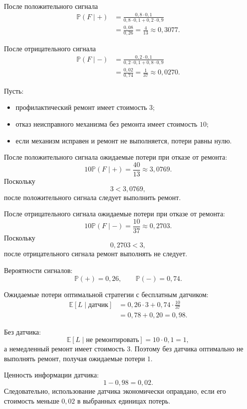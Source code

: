 \documentclass[12pt,a4paper]{article}
\theoremstyle{plain}
\theoremstyle{definition}
\theoremstyle{remark}
\newcommand{\Pp}{\mathbb{P}}
\newcommand{\Ee}{\mathbb{E}}
\begin{document}
После положительного сигнала
\[
\begin{aligned}
    \Pp(F\mid +)
    &=
    \frac{0{,}8\cdot 0{,}1}
    {0{,}8\cdot 0{,}1+0{,}2\cdot 0{,}9}
    \\
    &=
    \frac{0{,}08}{0{,}26}
    =
    \frac{4}{13}
    \approx 0{,}3077.
\end{aligned}
\]

После отрицательного сигнала
\[
\begin{aligned}
    \Pp(F\mid -)
    &=
    \frac{0{,}2\cdot 0{,}1}
    {0{,}2\cdot 0{,}1+0{,}8\cdot 0{,}9}
    \\
    &=
    \frac{0{,}02}{0{,}74}
    =
    \frac{1}{37}
    \approx 0{,}0270.
\end{aligned}
\]

Пусть:
\begin{itemize}
    \item профилактический ремонт имеет стоимость $3$;
    \item отказ неисправного механизма без ремонта имеет стоимость $10$;
    \item если механизм исправен и ремонт не выполняется, потери равны
    нулю.
\end{itemize}

После положительного сигнала ожидаемые потери при отказе от ремонта:
\[
    10\Pp(F\mid +)
    =
    \frac{40}{13}
    \approx 3{,}0769.
\]
Поскольку
\[
    3<3{,}0769,
\]
после положительного сигнала следует выполнить ремонт.

После отрицательного сигнала ожидаемые потери при отказе от ремонта:
\[
    10\Pp(F\mid -)
    =
    \frac{10}{37}
    \approx 0{,}2703.
\]
Поскольку
\[
    0{,}2703<3,
\]
после отрицательного сигнала ремонт выполнять не следует.

Вероятности сигналов:
\[
    \Pp(+)=0{,}26,
    \qquad
    \Pp(-)=0{,}74.
\]

Ожидаемые потери оптимальной стратегии с бесплатным датчиком:
\[
\begin{aligned}
    \Ee[L\mid\text{датчик}]
    &=
    0{,}26\cdot 3
    +
    0{,}74\cdot\frac{10}{37}
    \\
    &=0{,}78+0{,}20
    =0{,}98.
\end{aligned}
\]

Без датчика:
\[
    \Ee[L\mid\text{не ремонтировать}]
    =
    10\cdot 0{,}1
    =
    1,
\]
а немедленный ремонт имеет стоимость $3$. Поэтому без датчика
оптимально не выполнять ремонт, получая ожидаемые потери $1$.

Ценность информации датчика:
\[
    1-0{,}98=0{,}02.
\]
Следовательно, использование датчика экономически оправдано, если его
стоимость меньше $0{,}02$ в выбранных единицах потерь.
\end{document}
